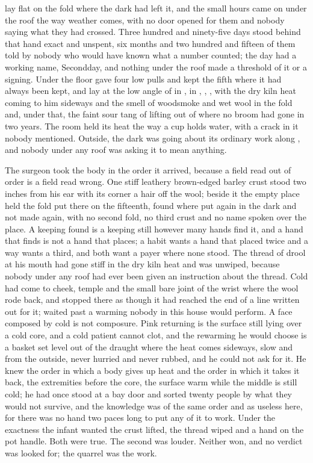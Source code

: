 
 lay flat on the fold where the dark had left it, and the small hours came on under the roof the way weather comes, with no door opened for them and nobody saying what they had crossed. Three hundred and ninety-five days stood behind that hand exact and unspent, six months and two hundred and fifteen of them told by nobody who would have known what a number counted; the day had a working name, Secondday, and nothing under the roof made a threshold of it or a signing. Under the floor  gave four low pulls and kept the fifth where it had always been kept, and  lay at the low angle of  in , in , , , with the dry kiln heat coming to him sideways and the smell of woodsmoke and wet wool in the fold and, under that, the faint sour tang of  lifting out of  where no broom had gone in two years. The room held its heat the way a cup holds water, with a crack in it nobody mentioned. Outside, the dark was going about its ordinary work along , and nobody under any roof was asking it to mean anything.

The surgeon took the body in the order it arrived, because a field read out of order is a field read wrong. One stiff leathery brown-edged barley crust stood two inches from his ear with its corner a hair off the wool; beside it the empty place held the fold put there on the fifteenth, found where put again in the dark and not made again, with no second fold, no third crust and no name spoken over the place. A keeping found is a keeping still however many hands find it, and a hand that finds is not a hand that places; a habit wants a hand that placed twice and a way wants a third, and both want a payer where none stood. The thread of drool at his mouth had gone stiff in the dry kiln heat and was unwiped, because nobody under any roof had ever been given an instruction about the thread. Cold had come to cheek, temple and the small bare joint of the wrist where the wool rode back, and stopped there as though it had reached the end of a line written out for it;  waited past a warming nobody in this house would perform. A face composed by cold is not composure. Pink returning is the surface still lying over a cold core, and a cold patient cannot clot, and the rewarming he would choose is a basket set level out of the draught where the heat comes sideways, slow and from the outside, never hurried and never rubbed, and he could not ask for it. He knew the order in which a body gives up heat and the order in which it takes it back, the extremities before the core, the surface warm while the middle is still cold; he had once stood at a bay door and sorted twenty people by what they would not survive, and the knowledge was of the same order and as useless here, for there was no hand two paces long to put any of it to work. Under the exactness the infant wanted the crust lifted, the thread wiped and a hand on the pot handle. Both were true. The second was louder. Neither won, and no verdict was looked for; the quarrel was the work.

